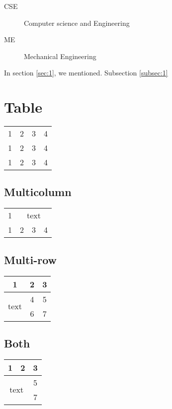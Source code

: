 \documentclass[14pt]{article}
\begin{document}
\begin{description}
	\item[CSE] Computer science and Engineering
	\item[ME] Mechanical Engineering
\end{description}


In section \ref{sec:1}, we mentioned. Subsection \ref{subsec:1}

\begin{figure}[h]
	\centering
\end{figure}


\section{Table}

\begin{tabular}{|c|ccc|}
	\hline
	1 & 2 & 3 & 4 \\ 
	\cline{1-3}
	1 & 2 & 3 & 4  \\
	\hline
	1 & 2 & 3 & 4 \\
	\hline
	
\end{tabular}


\subsection{Multicolumn}

\begin{tabular}{|c|ccc|}
	\hline
	1 & \multicolumn{3}{|c|}{text} \\ 
	\cline{2-4}
	1 & 2 & 3 & 4  \\
	\hline
	
\end{tabular}


\subsection{Multi-row}

\begin{tabular}{|c|c|c|}
	\hline
	1 & 2 & 3 \\ 
	\hline
	\multirow{2}{*}{text} & 4 & 5 \\
	& 6 & 7 \\ 
	\cline{2-3}
\end{tabular}

\subsection{Both}

\begin{tabular}{|cc|c|}
	\hline
	1 & 2 & 3 \\ 
	\hline
	\multicolumn{2}{|c|}{\multirow{2}{*}{text}} & 5 \\
	& & 7 \\
	\hline
	
	
\end{tabular}
\end{document}
